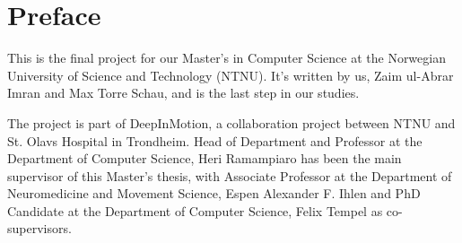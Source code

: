 \chapter*{Preface}
This is the final project for our Master's in Computer Science at the Norwegian University of Science and Technology (NTNU). It's written by us, Zaim ul-Abrar Imran and Max Torre Schau, and is the last step in our studies. 

The project is part of DeepInMotion, a collaboration project between NTNU and St. Olavs Hospital in Trondheim. Head of Department and Professor at the Department of Computer Science, Heri Ramampiaro has been the main supervisor of this Master's thesis, with Associate Professor at the Department of Neuromedicine and Movement Science, Espen Alexander F. Ihlen and  PhD Candidate at the Department of Computer Science, Felix Tempel as co-supervisors. 